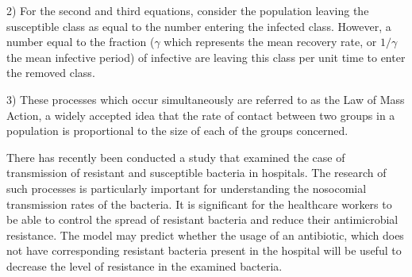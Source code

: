 2) For the second and third equations, consider the population leaving the susceptible class as equal to the number entering the infected class. However, a number equal to the fraction ($\gamma$ which represents the mean recovery rate, or $1/\gamma$ the mean infective period) of infective are leaving this class per unit time to enter the removed class.

3) These processes which occur simultaneously are referred to as the Law of Mass Action, a widely accepted idea that the rate of contact between two groups in a population is proportional to the size of each of the groups concerned\cite{per14}.

There has recently been conducted a study that examined the case of transmission of resistant and susceptible bacteria in hospitals. The research of such processes is particularly important for understanding the nosocomial transmission rates of the bacteria. It is significant for the healthcare workers to be able to control the spread of resistant bacteria and reduce their antimicrobial resistance. The model may predict whether the usage of an antibiotic, which does not have corresponding resistant bacteria present in the hospital will be useful to decrease the level of resistance in the examined bacteria.
